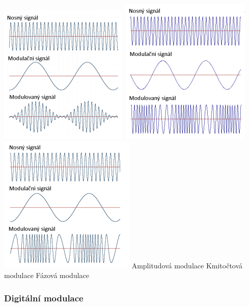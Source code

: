 \includegraphics[scale=0.62]{images/-016.png}
\includegraphics[scale=0.62]{images/-017.png}
\includegraphics[scale=0.62]{images/-018.png}
Amplitudová modulace \hspace{1.5cm} Kmitočtová modulace \hspace{1.5cm} Fázová modulace

\subsubsection{Digitální modulace}

